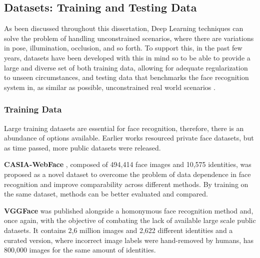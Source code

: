 \documentclass[class=report, crop=false, a4paper, 12pt]{standalone}
\begin{document}
\subsection{Datasets: Training and Testing Data}
\par As been discussed throughout this dissertation, Deep Learning techniques can solve the problem of handling unconstrained scenarios, where there are variations in pose, illumination, occlusion, and so forth. To support this, in the past few years, datasets have been developed with this in mind so to be able to provide a large and diverse set of both training data, allowing for adequate regularization to unseen circumstances, and testing data that benchmarks the face recognition system in, as similar as possible, unconstrained real world scenarios \autocite{duElementsEndtoendDeep2022}. 

\subsubsection{\large Training Data}
\par Large training datasets are essential for face recognition, therefore, there is an abundance of options available. Earlier works \autocite{schroffFaceNetUnifiedEmbedding2015,sunDeepLearningFace2014,taigmanDeepFaceClosingGap2014} resourced private face datasets, but as time passed, more public datasets were released. 

\vspace{0.7\baselineskip}
\noindent\textbf{CASIA-WebFace} \autocite{yiLearningFaceRepresentation2014}, composed of 494,414 face images and 10,575 identities, was proposed as a novel dataset to overcome the problem of data dependence in face recognition and improve comparability across different methods. By training on the same dataset, methods can be better evaluated and compared.

\vspace{0.7\baselineskip}
\noindent\textbf{VGGFace} \autocite{parkhiDeepFaceRecognition2015} was published alongside a homonymous face recognition method and, once again, with the objective of combating the lack of available large scale public datasets. It contains 2,6 million images and 2,622 different identities and a curated version, where incorrect image labels were hand-removed by humans, has 800,000 images for the same amount of identities.

\end{document}
